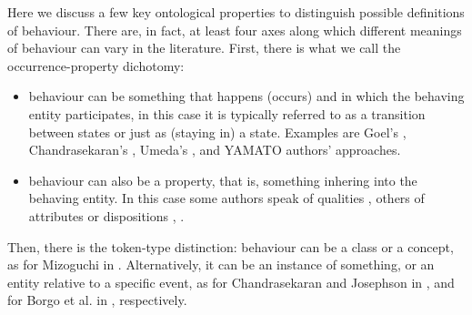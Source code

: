 \documentclass[sw]{iosart2x}
\newcommand{\YAMATO}{\textsc{YAMATO}\xspace}
\newcommand{\stateVarCond}[1]{%
  \ifthenelse{\equal{#1}{fullSingular}}{system condition}{%
    \ifthenelse{\equal{#1}{shortSingular}}{condition}{%
      \ifthenelse{\equal{#1}{fullPlural}}{system conditions}{%
        \ifthenelse{\equal{#1}{shortPlural}}{conditions}{%
          ERROR!%
        }%
      }%
    }%
  }%
}
\newcommand{\TODO}[1]{{\color{red} #1
}}
\begin{document}

Here we discuss a few key ontological properties to distinguish possible definitions of behaviour.
There are, in fact, at least four %
axes along which different meanings of behaviour can vary in the literature.
First, there is what we call the occurrence-property dichotomy:
\begin{itemize}
  \item behaviour can be something that happens (occurs) and in which the behaving entity participates, 
  in this case it is typically referred to as a transition between states or just as (staying in) a state. 
  Examples are Goel's \cite{goelStructureBehaviorFunction2009}, Chandrasekaran's \cite{chandrasekaranFunctionDeviceRepresentation2000}, Umeda's \cite{umedaFunctionBehaviourStructure1990}, and \YAMATO authors' \cite{mizoguchiFunctionalOntologyArtifacts2009} approaches.
  \item behaviour can also be a property, that is, something inhering into the behaving entity. 
  In this case some authors speak of qualities \cite{borgoFormalOntologicalPerspective2009}, others of attributes or dispositions \cite{vermaasConceptualFrameworkJohn2007}, \cite{geroCategorisingTechnologicalKnowledge2002}.
\end{itemize} 

Then, there is the token-type distinction: behaviour can be a class or a concept, as for  Mizoguchi in \cite{mizoguchiFunctionalOntologyArtifacts2009}. Alternatively, it can be an instance of something, or an entity relative to a specific event, as for Chandrasekaran and Josephson in \cite{chandrasekaranFunctionDeviceRepresentation2000}, and for Borgo et al. in \cite{borgoFormalOntologicalPerspective2009}, respectively. 
\end{document}
